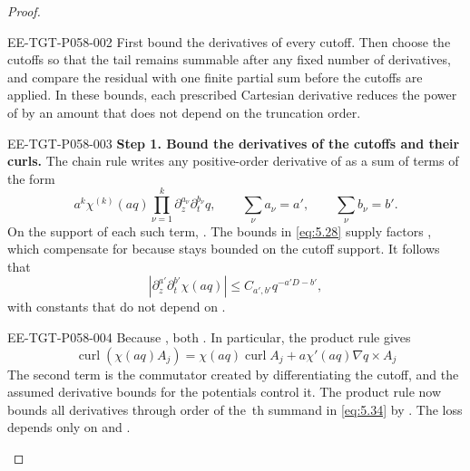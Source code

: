 \begin{proof}
\begin{EESegment}{EE-TGT-P058-002}
First bound the derivatives of every cutoff. Then choose the cutoffs so that the tail remains summable after any fixed
number of derivatives, and compare the residual with one finite partial sum before the cutoffs are applied. In these
bounds, each prescribed Cartesian derivative reduces the power of  by an amount that does not
depend on the truncation order.
\end{EESegment}

\begin{EESegment}{EE-TGT-P058-003}
\textbf{Step 1. Bound the derivatives of the cutoffs and their curls.}
The chain rule writes any positive-order derivative of  as a sum of terms of the form
\[
 a^k\chi^{(k)}(aq)\prod_{\nu=1}^{k}\partial_z^{a_\nu}\partial_t^{b_\nu}q,
 \qquad
 \sum_\nu a_\nu=a',
 \qquad
 \sum_\nu b_\nu=b'.
\]
On the support of each such term, . The bounds in \eqref{eq:5.28} supply factors
, which compensate for  because
 stays bounded on the cutoff support. It follows that
\[
 |\partial_z^{a'}\partial_t^{b'}\chi(aq)|
 \leq C_{a',b'}q^{-a'D-b'},
\]
with constants that do not depend on .
\end{EESegment}

\begin{EESegment}{EE-TGT-P058-004}
Because , both
. In particular, the product rule gives
\[
 \operatorname{curl}(\chi(aq)A_j)
 =\chi(aq)\operatorname{curl}A_j+a\chi'(aq)\nabla q\times A_j
\]
The second term is the commutator created by differentiating the cutoff, and the assumed derivative bounds for the potentials control it. The product rule now bounds all derivatives through
order  of the \,th summand in \eqref{eq:5.34} by
. The loss
 depends only on  and
.
\end{EESegment}


\end{proof}

